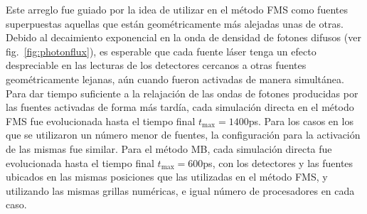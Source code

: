 Este arreglo fue guiado por la idea de utilizar en el método FMS como fuentes superpuestas 
aquellas que están geométricamente más alejadas unas de otras. Debido 
al decaimiento exponencial en la onda de densidad de fotones difusos (ver fig.~\ref{fig:photonflux}), es esperable que cada fuente láser tenga un efecto despreciable en las lecturas de los detectores cercanos a otras fuentes geométricamente lejanas, 
aún cuando fueron activadas de manera simultánea. Para dar tiempo suficiente 
a la relajación de las ondas de fotones producidas por las fuentes activadas 
de forma más tardía, cada simulación directa en el método FMS fue evolucionada 
hasta el tiempo final $t_{\text{max}}=1400$ps. Para los casos en los que se utilizaron 
un número menor de fuentes, la configuración para la activación de las mismas 
fue similar. Para el método MB, cada simulación directa fue evolucionada hasta el tiempo 
final $t_{\text{max}}=600$ps, con los detectores y las fuentes ubicados en las mismas 
posiciones que las utilizadas en el método FMS, y utilizando las mismas grillas numéricas, 
e igual número de procesadores en cada caso.


